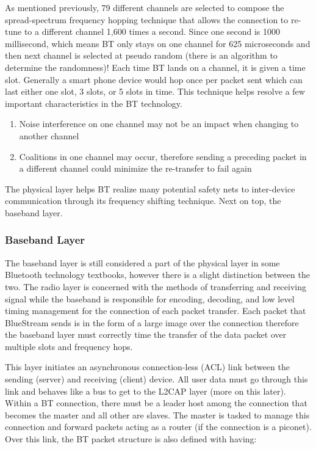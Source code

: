 \documentclass[a4paper,12pt]{article}
\begin{document}
As mentioned previously, 79 different channels are selected to compose the spread-spectrum frequency hopping technique that allows the connection to re-tune to a different channel 1,600 times a second. Since one second is 1000 millisecond, which means BT only stays on one channel for 625 microseconds and then next channel is selected at pseudo random (there is an algorithm to determine the randomness)! Each time BT lands on a channel, it is given a time slot. Generally a smart phone device would hop once per packet sent which can last either one slot, 3 slots, or 5 slots in time. This technique helps resolve a few important characteristics in the BT technology.

\begin{enumerate}
\item Noise interference on one channel may not be an impact when changing to another channel
\item Coalitions in one channel may occur, therefore sending a preceding packet in a different channel could minimize the re-transfer to fail again
\end{enumerate}

The physical layer helps BT realize many potential safety nets to inter-device communication through its frequency shifting technique. Next on top, the baseband layer.

\subsubsection{Baseband Layer}
The baseband layer is still considered a part of the physical layer in some Bluetooth technology textbooks, however there is a slight distinction between the two. The radio layer is concerned with the methods of transferring and receiving signal while the baseband is responsible for encoding, decoding, and low level timing management for the connection of each packet transfer. Each packet that BlueStream sends is in the form of a large image over the connection therefore the baseband layer must correctly time the transfer of the data packet over multiple slots and frequency hops. 

This layer initiates an asynchronous connection-less (ACL) link between the sending (server) and receiving (client) device. All user data must go through this link and behaves like a bus to get to the L2CAP layer (more on this later). Within a BT connection, there must be a leader host among the connection that becomes the master and all other are slaves. The master is tasked to manage this connection and forward packets acting as a router (if the connection is a piconet). Over this link, the BT packet structure is also defined with having:
\end{document}
